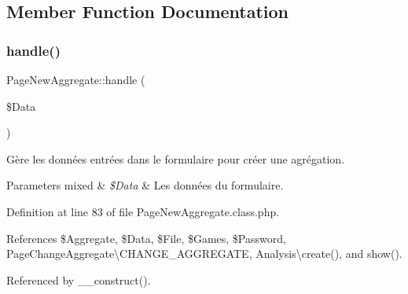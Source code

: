 \subsection{Member Function Documentation}
\mbox{\label{class_page_new_aggregate_a5ceaf2dbf2a63f97181ae557f50908e4}} 
\subsubsection{\texorpdfstring{handle()}{handle()}}
{\footnotesize\ttfamily Page\+New\+Aggregate\+::handle (\begin{DoxyParamCaption}\item[{}]{\$\+Data }\end{DoxyParamCaption})\hspace{0.3cm}{\ttfamily [protected]}}

Gère les données entrées dans le formulaire pour créer une agrégation.


\begin{DoxyParams}[1]{Parameters}
mixed & {\em \$\+Data} & Les données du formulaire. \\
\hline
\end{DoxyParams}


Definition at line 83 of file Page\+New\+Aggregate.\+class.\+php.



References \$\+Aggregate, \$\+Data, \$\+File, \$\+Games, \$\+Password, Page\+Change\+Aggregate\textbackslash{}\+C\+H\+A\+N\+G\+E\+\_\+\+A\+G\+G\+R\+E\+G\+A\+TE, Analysis\textbackslash{}create(), and show().



Referenced by \+\_\+\+\_\+construct().

